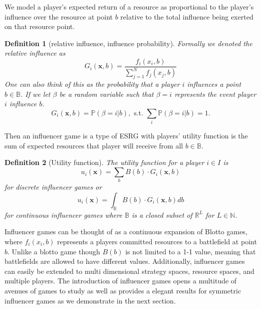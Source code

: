 \documentclass{article}
\newtheorem{definition}{Definition}
\newcommand {\B}{\mathbb{B}}
\begin{document}
                We model a player's expected return of a resource as proportional to the player's influence over the resource at point $b$ relative to the total influence being exerted on that resource point. 
                \begin{definition}[relative influence, influence probability]
                    Formally we denoted the relative influence as 
                    \begin{equation}\label{eq:SI_relative_influence}
                        G_i(\mathbf{x},b)=\frac{f_i(x_i,b)}{\sum_{j=1}^{N}f_j(x_j,b)}
                    \end{equation}
                    One can also think of this as the probability that a player $i$ influences a point $b\in \B$. If we let $\beta$ be a random variable such that $\beta=i$ represents the event player $i$ influence $b$.                    \begin{equation}\label{eq:SI_relative_influence_prob}
                        G_i(\mathbf{x},b)=\mathbb{P}(\beta=i|b), \text{ s.t. } \sum_i\mathbb{P}(\beta=i|b)=1.
                    \end{equation}
                \end{definition}
                Then an influencer game is a type of ESRG with players' utility function is the sum of expected resources that player will receive from all $b\in \mathbb{B}$. 
                \begin{definition}[Utility function]
                    The utility function for a player $i\in I$ is 
                    \begin{equation}
                        u_{i}(\mathbf{x})=\sum_{b} B(b)\cdot  G_i(\mathbf{x},b)
                    \end{equation}
                    for discrete influencer games or 
                    \begin{equation}
                         u_{i}(\mathbf{x})=\int_{\mathbb{B}} B(b)\cdot G_i(\mathbf{x},b)db
                    \end{equation}
                    for continuous influencer games where $\mathbb{B}$ is a closed subset of $\mathbb{R}^L$ for $L\in \mathbb{N}$.
                \end{definition}

        Influencer games can be thought of as a continuous expansion of Blotto games, where $f_i(x_i,b)$ represents a players committed resources to a battlefield at point $b$. Unlike a blotto game though $B(b)$ is not limited to a 1-1 value, meaning that battlefields are allowed to have different values. Additionally, influencer games can easily be extended to multi dimensional strategy spaces, resource spaces, and multiple players. The introduction of influencer games opens a multitude of avenues of games to study as well as provides a elegant results for symmetric influencer games as we demonstrate in the next section. 
        
\end{document}
